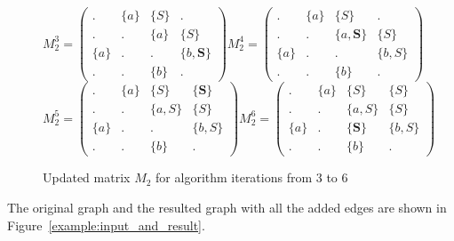 \begin{figure}[ht]
    \centering
    $$
    M_2^3 =
    \begin{pmatrix}
    .     & \{a\} & \{S\} & .       \\
    .     & .     & \{a\} & \{S\}   \\
    \{a\} & .     & .     & \{b, \textbf{S}\} \\
    .     & .     & \{b\} & .
    \end{pmatrix}
    M_2^4 =
    \begin{pmatrix}
    .     & \{a\} & \{S\}   & .       \\
    .     & .     & \{a, \textbf{S}\} & \{S\}   \\
    \{a\} & .     & .       & \{b, S\} \\
    .     & .     & \{b\}   & .
    \end{pmatrix}
    $$
    $$
    M_2^5 =
    \begin{pmatrix}
    .     & \{a\} & \{S\}   & \{\textbf{S}\}   \\
    .     & .     & \{a, S\} & \{S\}   \\
    \{a\} & .     & .       & \{b, S\} \\
    .     & .     & \{b\}   & .
    \end{pmatrix}
    M_2^6 =
    \begin{pmatrix}
    .     & \{a\} & \{S\}   & \{S\}   \\
    .     & .     & \{a, S\} & \{S\}   \\
    \{a\} & .     & \{\textbf{S}\}   & \{b, S\} \\
    .     & .     & \{b\}   & .
    \end{pmatrix}
    $$
    \caption{Updated matrix $M_2$ for algorithm iterations from 3 to 6}
    \label{example:iteration3to6res}
\end{figure}

The original graph and the resulted graph with all the added edges are shown in Figure~\ref{example:input_and_result}.


